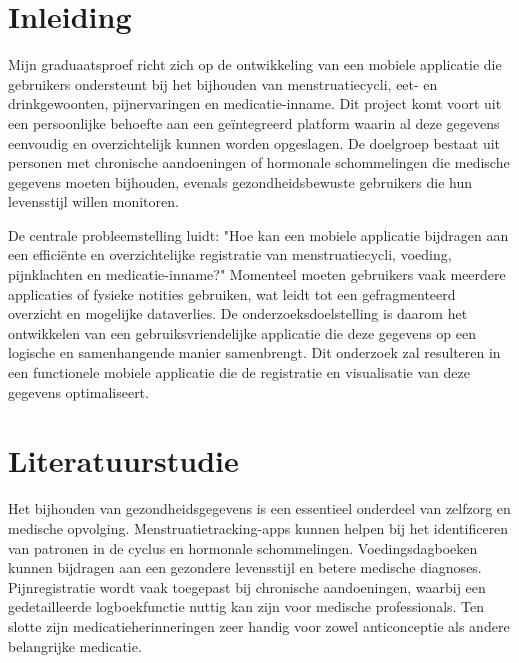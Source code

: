 


% 

\section{Inleiding}%
\label{sec:inleiding}

Mijn graduaatsproef richt zich op de ontwikkeling van een mobiele applicatie die gebruikers ondersteunt bij het bijhouden van menstruatiecycli, eet- en drinkgewoonten, pijnervaringen en medicatie-inname. Dit project komt voort uit een persoonlijke behoefte aan een geïntegreerd platform waarin al deze gegevens eenvoudig en overzichtelijk kunnen worden opgeslagen. De doelgroep bestaat uit personen met chronische aandoeningen of hormonale schommelingen die medische gegevens moeten bijhouden, evenals gezondheidsbewuste gebruikers die hun levensstijl willen monitoren.

De centrale probleemstelling luidt: "Hoe kan een mobiele applicatie bijdragen aan een efficiënte en overzichtelijke registratie van menstruatiecycli, voeding, pijnklachten en medicatie-inname?" Momenteel moeten gebruikers vaak meerdere applicaties of fysieke notities gebruiken, wat leidt tot een gefragmenteerd overzicht en mogelijke dataverlies. De onderzoeksdoelstelling is daarom het ontwikkelen van een gebruiksvriendelijke applicatie die deze gegevens op een logische en samenhangende manier samenbrengt. Dit onderzoek zal resulteren in een functionele mobiele applicatie die de registratie en visualisatie van deze gegevens optimaliseert.


\section{Literatuurstudie}%
\label{sec:literatuurstudie}
Het bijhouden van gezondheidsgegevens is een essentieel onderdeel van zelfzorg en medische opvolging. Menstruatietracking-apps kunnen helpen bij het identificeren van patronen in de cyclus en hormonale schommelingen. Voedingsdagboeken kunnen bijdragen aan een gezondere levensstijl en betere medische diagnoses. Pijnregistratie wordt vaak toegepast bij chronische aandoeningen, waarbij een gedetailleerde logboekfunctie nuttig kan zijn voor medische professionals. Ten slotte zijn medicatieherinneringen zeer handig voor zowel anticonceptie als andere belangrijke medicatie. 

